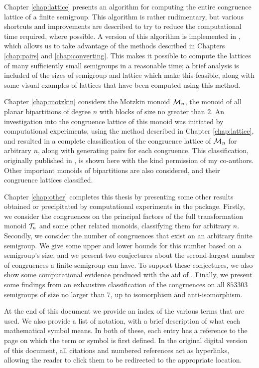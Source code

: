 Chapter \ref{chap:lattice} presents an algorithm for computing the entire
congruence lattice of a finite semigroup.  This algorithm is rather rudimentary,
but various shortcuts and improvements are described to try to reduce the
computational time required, where possible.  A version of this algorithm is
implemented in \Semigroups{}, which allows us to take advantage of the methods
described in Chapters \ref{chap:pairs} and \ref{chap:converting}.  This makes it
possible to compute the lattices of many sufficiently small semigroups in a
reasonable time; a brief analysis is included of the sizes of semigroup and
lattice which make this feasible, along with some visual examples of lattices
that have been computed using this method.

Chapter \ref{chap:motzkin} considers the Motzkin monoid $\mathcal{M}_n$, the monoid of
all planar bipartitions of degree $n$ with blocks of size no greater than $2$.
An investigation into the congruence lattice of this monoid was initiated by
computational experiments, using the method described in Chapter
\ref{chap:lattice}, and resulted in a complete classification of the congruence
lattice of $\mathcal{M}_n$ for arbitrary $n$, along with generating pairs for each
congruence.  This classification, originally published in \cite{ourpaper}, is
shown here with the kind permission of my co-authors.  Other important monoids
of bipartitions are also considered, and their congruence lattices classified.

Chapter \ref{chap:other} completes this thesis by presenting some other results
obtained or precipitated by computational experiments in the \Semigroups{}
package.  Firstly, we consider the congruences on the principal factors of the
full transformation monoid $\mathcal{T}_n$ and some other related monoids, classifying
them for arbitrary $n$.  Secondly, we consider the number of congruences that
exist on an arbitrary finite semigroup.  We give some upper and lower bounds for
this number based on a semigroup's size, and we present two conjectures about
the second-largest number of congruences a finite semigroup can have.  To
support these conjectures, we also show some computational evidence produced
with the aid of \smallsemi{} \cite{smallsemi}.  Finally, we present some
findings from an exhaustive classification of the congruences on all $853303$
semigroups of size no larger than $7$, up to isomorphism and anti-isomorphism.

At the end of this document we provide an index of the various terms that are
used.  We also provide a list of notation, with a brief description of what each
mathematical symbol means.  In both of these, each entry has a reference to the
page on which the term or symbol is first defined.  In the original digital
version of this document, all citations and numbered references act as
hyperlinks, allowing the reader to click them to be redirected to the
appropriate location.

